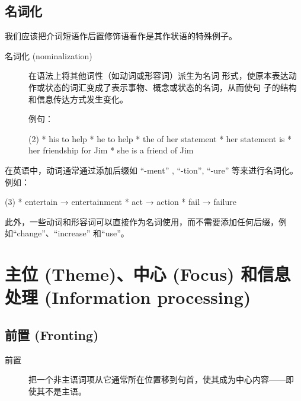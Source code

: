 \subsection{名词化}

我们应该把介词短语作后置修饰语看作是其作状语的特殊例子。

\begin{description}
\item[名词化 (nominalization)] 在语法上将其他词性（如动词或形容词）派生为名词
  形式，使原本表达动作或状态的词汇变成了表示事物、概念或状态的名词，从而使句
  子的结构和信息传达方式发生变化。


  例句：
  \begin{taskitem}(2)
    * his  to help
    * he  to help
    * the  of her statement
    * her statement is 
    * her friendship for Jim
    * she is a friend of Jim
  \end{taskitem}
\end{description}

在英语中，动词通常通过添加后缀如 ``-ment'' , ``-tion'', ``-ure'' 等来进行名词化。例如：
\begin{taskitem}(3)
* entertain → entertainment
* act → action
* fail → failure
\end{taskitem}
此外，一些动词和形容词可以直接作为名词使用，而不需要添加任何后缀，例
如``change''、``increase'' 和``use''。

\section{主位 (Theme)、中心 (Focus) 和信息处理 (Information processing)}


\subsection{前置 (Fronting)}

\begin{description}
\item[前置] 把一个非主语词项从它通常所在位置移到句首，使其成为中心内容——即
  使其不是主语。
\end{description}

